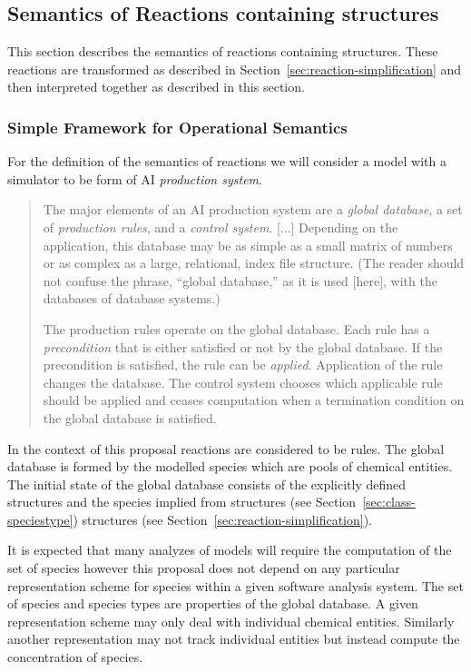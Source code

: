 \documentclass{cekarticle}
\begin{document}
\subsection{Semantics of Reactions containing  structures}
\label{sec:reaction-semantics-GBs}

This section describes the semantics of reactions containing
 structures.  These reactions are transformed
as described in Section~\ref{sec:reaction-simplification} and then
interpreted together as described in this section.

\subsubsection{Simple Framework for Operational Semantics}

For the definition of the semantics of reactions we will consider a model with a simulator to be form of
AI \emph{production system}.

\begin{quote}
The major elements of an AI production system are a \emph{global database}, a set of
\emph{production rules}, and a \emph{control system}.
[...]
Depending on the application, this database may be as simple as a small matrix of numbers or as
complex as a large, relational, index file structure.  (The reader should not confuse the phrase,
``global database,'' as it is used [here], with the databases of database systems.)

The production rules operate on the global database.  Each rule has a \emph{precondition} that is either
satisfied or not by the global database.  If the precondition is satisfied, the rule can be
\emph{applied}.  Application of the rule changes the database.  The control system chooses which
applicable rule should be applied and ceases computation when a termination condition on the global
database is satisfied.~\citep{Nilsson:1982}
\end{quote}

In the context of this proposal reactions are considered to be
rules. The global database is formed by the modelled species which
are pools of chemical entities.  The initial state of the global
database consists of the explicitly defined 
structures and the species implied from 
structures (see Section~\ref{sec:class-speciestype})
 structures (see
Section~\ref{sec:reaction-simplification}).

It is expected that many analyzes of models will require the
computation of the set of species however this proposal does not
depend on any particular representation scheme for species within
a given software analysis system.  The set of species and species
types are properties of the global database. A given
representation scheme may only deal with individual chemical
entities. Similarly another representation may not track
individual entities but instead compute the concentration of
species.
\end{document}
